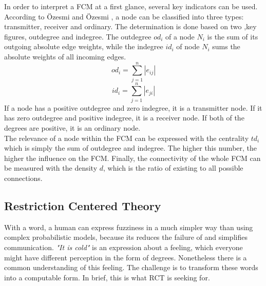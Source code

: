 \documentclass[conference]{IEEEtran}
\begin{document}
In order to interpret a FCM at a first glance, several key indicators can be used. According to \"Ozesmi and \"Ozesmi \cite{ozesmi2004}, a node can be classified into three types: transmitter, receiver and ordinary. The determination is done based on two ,key figures, outdegree and indegree. The outdegree \begin{math} od_{i} \end{math} of a node \begin{math} N_{i} \end{math} is the sum of its outgoing absolute edge weights, while the indegree \begin{math} id_{i} \end{math} of node \begin{math} N_{i} \end{math} sums the absolute weights of all incoming edges.\\
\begin{equation}
od_{i} = \sum_{j=1}^{n}|e_{ij}|
\end{equation}
\begin{equation}
id_{i} = \sum_{j=1}^{n}|e_{ji}|
\end{equation}
If a node has a positive outdegree and zero indegree, it is a transmitter node. If it has zero outdegree and positive indegree, it is a receiver node. If both of the degrees are positive, it is an ordinary node.\\
The relevance of a node within the FCM can be expressed with the centrality \begin{math}td_{i} \end{math} which is simply the sum of outdegree and indegree. The higher this number, the higher the influence on the FCM. Finally, the connectivity of the whole FCM can be measured with the density \begin{math} d \end{math}, which is the ratio of existing to all possible connections.\\

\subsection{Restriction Centered Theory}
With a word, a human can express fuzziness in a much simpler way than using complex probabilistic models, because its reduces the failure of and simplifies communication. \emph{"It is cold"} is an expression about a feeling, which everyone might have different perception in the form of degrees. Nonetheless there is a common understanding of this feeling. The challenge is to transform these words into a computable form. In brief, this is what RCT is seeking for.\\
\end{document}
